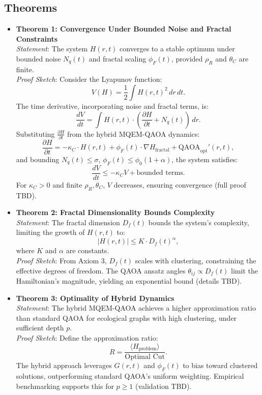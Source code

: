 \documentclass{article}
\theoremstyle{plain}
\begin{document}
\subsection{Theorems}
\begin{itemize}
    \item \textbf{Theorem 1: Convergence Under Bounded Noise and Fractal Constraints} \\
    \textit{Statement}: The system \( H(r,t) \) converges to a stable optimum under bounded noise \( N_q(t) \) and fractal scaling \( \phi_F(t) \), provided \( \rho_R \) and \( \theta_C \) are finite. \\
    \textit{Proof Sketch}: Consider the Lyapunov function:
    \[
    V(H) = \frac{1}{2} \int H(r,t)^2 \, dr \, dt.
    \]
    The time derivative, incorporating noise and fractal terms, is:
    \[
    \frac{dV}{dt} = \int H(r,t) \cdot \left( \frac{\partial H}{\partial t} + N_q(t) \right) \, dr.
    \]
    Substituting \( \frac{\partial H}{\partial t} \) from the hybrid MQEM-QAOA dynamics:
    \[
    \frac{\partial H}{\partial t} = -\kappa_C \cdot H(r,t) + \phi_F(t) \cdot \nabla H_{\text{fractal}} + \text{QAOA}_{\text{opt}}'(r,t),
    \]
    and bounding \( N_q(t) \leq \sigma \), \( \phi_F(t) \leq \phi_0 (1 + \alpha) \), the system satisfies:
    \[
    \frac{dV}{dt} \leq -\kappa_C V + \text{bounded terms}.
    \]
    For \( \kappa_C > 0 \) and finite \( \rho_R, \theta_C \), \( V \) decreases, ensuring convergence (full proof TBD).

    \item \textbf{Theorem 2: Fractal Dimensionality Bounds Complexity} \\
    \textit{Statement}: The fractal dimension \( D_f(t) \) bounds the system’s complexity, limiting the growth of \( H(r,t) \) to:
    \[
    |H(r,t)| \leq K \cdot D_f(t)^\alpha,
    \]
    where \( K \) and \( \alpha \) are constants. \\
    \textit{Proof Sketch}: From Axiom 3, \( D_f(t) \) scales with clustering, constraining the effective degrees of freedom. The QAOA ansatz angles \( \theta_{ij} \propto D_f(t) \) limit the Hamiltonian’s magnitude, yielding an exponential bound (details TBD).

    \item \textbf{Theorem 3: Optimality of Hybrid Dynamics} \\
    \textit{Statement}: The hybrid MQEM-QAOA achieves a higher approximation ratio than standard QAOA for ecological graphs with high clustering, under sufficient depth \( p \). \\
    \textit{Proof Sketch}: Define the approximation ratio:
    \[
    R = \frac{\langle H_{\text{problem}} \rangle}{\text{Optimal Cut}}.
    \]
    The hybrid approach leverages \( G(r,t) \) and \( \phi_F(t) \) to bias toward clustered solutions, outperforming standard QAOA’s uniform weighting. Empirical benchmarking supports this for \( p \geq 1 \) (validation TBD).


\end{itemize}
\end{document}
